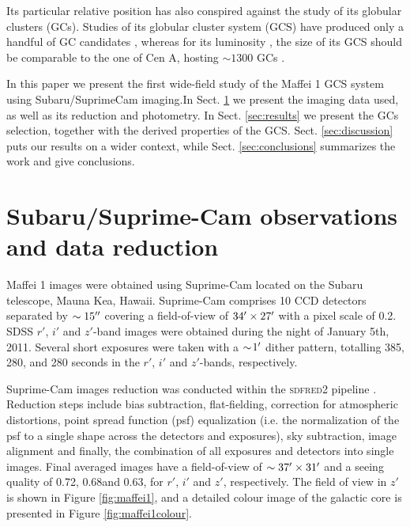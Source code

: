 \documentclass[useAMS,usenatbib]{mn2e}
\begin{document}
Its particular relative position has also conspired against the study
of its globular clusters (GCs). Studies of its globular cluster system
(GCS) have produced only a handful of GC candidates
\citep{davidge02,buta03,davidge05}, whereas for its luminosity
\citep[$M_V\sim-20.80$,][]{fingerhut07}, the size of its GCS should be
comparable to the one of Cen A, hosting $\sim 1300$ GCs
\citep{harris10}. 

In this paper we present the first wide-field study of the Maffei 1
GCS system using Subaru/SuprimeCam imaging.In Sect. \ref{sec:obs} we
present the imaging data used, as well as its reduction and
photometry. In Sect. \ref{sec:results} we present the GCs selection,
together with the derived properties of the
GCS. Sect. \ref{sec:discussion} puts our results on a wider context,
while Sect. \ref{sec:conclusions} summarizes the work and give
conclusions.

\section{Subaru/Suprime-Cam observations and data reduction}
\label{sec:obs}



Maffei 1 images were obtained using Suprime-Cam \citep{miyazaki02}
located on the Subaru telescope, Mauna Kea, Hawaii. Suprime-Cam
comprises 10 CCD detectors separated by $\sim15\hbox{$^{\prime\prime}$}$ covering a
field-of-view of $34\hbox{$^\prime$}\times27\hbox{$^\prime$}$ with a pixel scale of
0.2\arcsec. SDSS $r'$, $i'$ and $z'$-band images were obtained during
the night of January 5th, 2011.  Several short exposures were taken
with a $\sim\!  1\hbox{$^\prime$}$ dither pattern, totalling 385, 280, and 280
seconds in the $r'$, $i'$ and $z'$-bands, respectively.

Suprime-Cam images reduction was conducted within the \textsc{sdfred2}
pipeline \citep{ouchi04}. Reduction steps include bias subtraction,
flat-fielding, correction for atmospheric distortions, point spread
function (psf) equalization (i.e. the normalization of the psf to a
single shape across the detectors and exposures), sky subtraction,
image alignment and finally, the combination of all exposures and
detectors into single images. Final averaged images have a
field-of-view of $\sim37\hbox{$^\prime$}\times 31\hbox{$^\prime$}$ and a seeing quality
of 0.72\arcsec, 0.68\arcsec and 0.63\arcsec, for $r'$, $i'$ and $z'$,
respectively. The field of view in $z'$ is shown in Figure \ref{fig:maffei1}, and a detailed colour image of the galactic core is presented in Figure \ref{fig:maffei1colour}.
\end{document}
